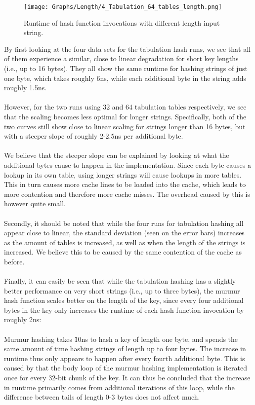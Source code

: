 \documentclass[11pt]{article} %
\begin{document}
\begin{figure}[H]
  \centering
  \texttt{[image: Graphs/Length/4\_Tabulation\_64\_tables\_length.png]}\\
  \caption{Runtime of hash function invocations with different length input string.}\label{fig:key_length}
\end{figure}
\noindent
By first looking at the four data sets for the tabulation hash runs, we see that all of them experience a similar, close to linear degradation for short key lengths (i.e., up to 16 bytes). They all show the same runtime for hashing strings of just one byte, which takes roughly 6ns, while each additional byte in the string adds roughly 1.5ns.\\
\\
However, for the two runs using 32 and 64 tabulation tables respectively, we see that the scaling becomes less optimal for longer strings. Specifically, both of the two curves still show close to linear scaling for strings longer than 16 bytes, but with a steeper slope of roughly 2-2.5ns per additional byte. \\
\\
We believe that the steeper slope can be explained by looking at what the additional bytes cause to happen in the implementation. Since each byte causes a lookup in its own table, using longer strings will cause lookups in more tables. This in turn causes more cache lines to be loaded into the cache, which leads to more contention and therefore more cache misses. The overhead caused by this is however quite small.\\
\\
Secondly, it should be noted that while the four runs for tabulation hashing all appear close to linear, the standard deviation (seen on the error bars) increases as the amount of tables is increased, as well as when the length of the strings is increased. We believe this to be caused by the same contention of the cache as before.\\
\\
Finally, it can easily be seen that while the tabulation hashing has a slightly better performance on very short strings (i.e., up to three bytes), the murmur hash function scales better on the length of the key, since every four additional bytes in the key only increases the runtime of each hash function invocation by roughly 2ns: \\
\\
Murmur hashing takes \~10ns to hash a key of length one byte, and spends the same amount of time hashing strings of length up to four bytes. The increase in runtime thus only appears to happen after every fourth additional byte. This is caused by that the body loop of the murmur hashing implementation is iterated once for every 32-bit chunk of the key. It can thus be concluded that the increase in runtime primarily comes from additional iterations of this loop, while the difference between tails of length 0-3 bytes does not affect much.
\end{document}
